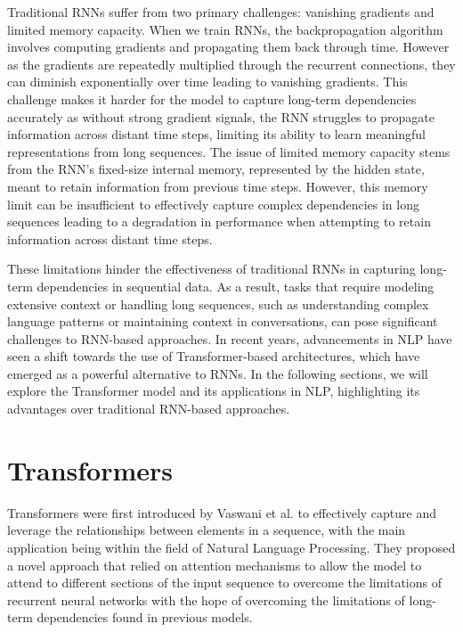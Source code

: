 Traditional RNNs suffer from two primary challenges: vanishing gradients and limited memory capacity. When we train RNNs, the backpropagation algorithm involves computing gradients and propagating them back through time. However as the gradients are repeatedly multiplied through the recurrent connections, they can diminish exponentially over time leading to vanishing gradients. This challenge makes it harder for the model to capture long-term dependencies accurately as without strong gradient signals, the RNN struggles to propagate information across distant time steps, limiting its ability to learn meaningful representations from long sequences. The issue of limited memory capacity stems from the RNN's fixed-size internal memory, represented by the hidden state, meant to retain information from previous time steps. However, this memory limit can be insufficient to effectively capture complex dependencies in long sequences leading to a degradation in performance when attempting to retain information across distant time steps.

These limitations hinder the effectiveness of traditional RNNs in capturing long-term dependencies in sequential data. As a result, tasks that require modeling extensive context or handling long sequences, such as understanding complex language patterns or maintaining context in conversations, can pose significant challenges to RNN-based approaches. In recent years, advancements in NLP have seen a shift towards the use of Transformer-based architectures, which have emerged as a powerful alternative to RNNs. In the following sections, we will explore the Transformer model and its applications in NLP, highlighting its advantages over traditional RNN-based approaches.

\section{Transformers}

Transformers were first introduced by Vaswani et al. \cite{transformer_paper} to effectively capture and leverage the relationships between elements in a sequence, with the main application being within the field of Natural Language Processing. They proposed a novel approach that relied on attention mechanisms to allow the model to attend to different sections of the input sequence to overcome the limitations of recurrent neural networks with the hope of overcoming the limitations of long-term dependencies found in previous models.

